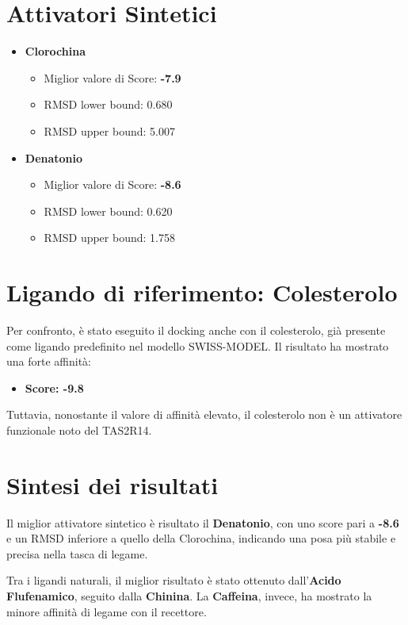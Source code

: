 \documentclass[12pt, a4paper]{book}
\begin{document}
\section*{Attivatori Sintetici}
\begin{itemize}
    \item \textbf{Clorochina}
    \begin{itemize}
        \item Miglior valore di Score: \textbf{-7.9}
        \item RMSD lower bound: 0.680
        \item RMSD upper bound: 5.007
    \end{itemize}

    \item \textbf{Denatonio}
    \begin{itemize}
        \item Miglior valore di Score: \textbf{-8.6}
        \item RMSD lower bound: 0.620
        \item RMSD upper bound: 1.758
    \end{itemize}
\end{itemize}

\section*{Ligando di riferimento: Colesterolo}
Per confronto, è stato eseguito il docking anche con il colesterolo, già presente come ligando predefinito nel modello SWISS-MODEL. Il risultato ha mostrato una forte affinità:
\begin{itemize}
    \item \textbf{Score: -9.8}
\end{itemize}

Tuttavia, nonostante il valore di affinità elevato, il colesterolo non è un attivatore funzionale noto del TAS2R14.

\section*{Sintesi dei risultati}
Il miglior attivatore sintetico è risultato il \textbf{Denatonio}, con uno score pari a \textbf{-8.6} e un RMSD inferiore a quello della Clorochina, indicando una posa più stabile e precisa nella tasca di legame.

Tra i ligandi naturali, il miglior risultato è stato ottenuto dall’\textbf{Acido Flufenamico}, seguito dalla \textbf{Chinina}. La \textbf{Caffeina}, invece, ha mostrato la minore affinità di legame con il recettore.
\newpage
\end{document}
